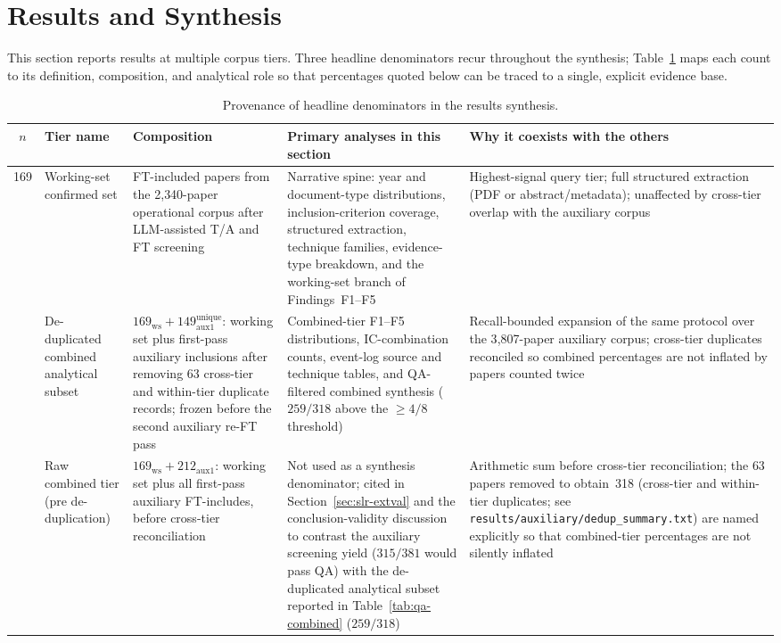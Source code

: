 \section{Results and Synthesis}
\label{sec:slr-synthesis}

This section reports results at multiple corpus tiers. Three headline
denominators recur throughout the synthesis; Table~\ref{tab:denominator-provenance}
maps each count to its definition, composition, and analytical role so that
percentages quoted below can be traced to a single, explicit evidence base.

\begin{table}[htbp]
\centering
\caption{Provenance of headline denominators in the results synthesis.}
\label{tab:denominator-provenance}
\small
\setlength{\tabcolsep}{3pt}
\begin{tabular}{c p{2.4cm} p{2.6cm} p{4.2cm} p{3.4cm}}
\toprule
\textbf{$n$} & \textbf{Tier name} & \textbf{Composition} & \textbf{Primary analyses in this section} & \textbf{Why it coexists with the others} \\
\midrule
169 &
  Working-set confirmed set &
  FT-included papers from the 2{,}340-paper operational corpus after LLM-assisted T/A and FT screening &
  Narrative spine: year and document-type distributions, inclusion-criterion coverage, structured extraction, technique families, evidence-type breakdown, and the working-set branch of Findings~F1--F5 &
  Highest-signal query tier; full structured extraction (PDF or abstract/metadata); unaffected by cross-tier overlap with the auxiliary corpus \\
\addlinespace
318 &
  De-duplicated combined analytical subset &
  $169_{\text{ws}} + 149_{\text{aux1}}^{\text{unique}}$: working set plus first-pass auxiliary inclusions after removing 63 cross-tier and within-tier duplicate records; frozen before the second auxiliary re-FT pass &
  Combined-tier F1--F5 distributions, IC-combination counts, event-log source and technique tables, and QA-filtered combined synthesis ($259/318$ above the $\geq 4/8$ threshold) &
  Recall-bounded expansion of the same protocol over the 3{,}807-paper auxiliary corpus; cross-tier duplicates reconciled so combined percentages are not inflated by papers counted twice \\
\addlinespace
381 &
  Raw combined tier (pre de-duplication) &
  $169_{\text{ws}} + 212_{\text{aux1}}$: working set plus all first-pass auxiliary FT-includes, before cross-tier reconciliation &
  Not used as a synthesis denominator; cited in Section~\ref{sec:slr-extval} and the conclusion-validity discussion to contrast the auxiliary screening yield ($315/381$ would pass QA) with the de-duplicated analytical subset reported in Table~\ref{tab:qa-combined} ($259/318$) &
  Arithmetic sum before cross-tier reconciliation; the $63$ papers removed to obtain~318 (cross-tier and within-tier duplicates; see \texttt{results/auxiliary/dedup\_summary.txt}) are named explicitly so that combined-tier percentages are not silently inflated \\
\bottomrule
\end{tabular}


\end{table}
